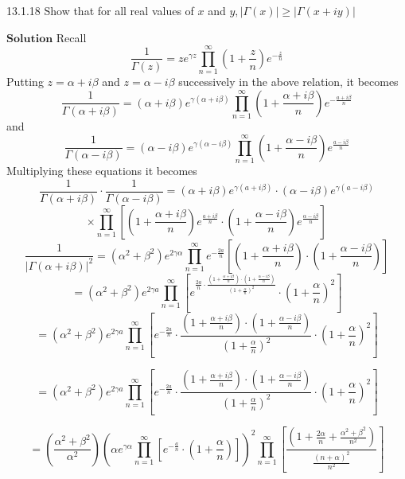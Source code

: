 \documentclass{styles/kaobook}
\begin{document}
\begin{greenbox}{13.1.18}
Show that for all real values of $x$ and $y,|\Gamma(x)| \geq|\Gamma(x+i y)|$
\end{greenbox}


$\boxed{\textbf{Solution}}$ Recall 
$$
\frac{1}{\Gamma(z)}=z e^{\gamma z} \prod_{n=1}^{\infty}\left(1+\frac{z}{n}\right) e^{-\frac{z}{n}}
$$
Putting $z=\alpha+i \beta$ and $z=\alpha-i \beta$ successively in the above relation, it becomes
$$
\frac{1}{\Gamma(\alpha+i \beta)}=(\alpha+i \beta) e^{\gamma(\alpha+i \beta)} \prod_{n=1}^{\infty}\left(1+\frac{\alpha+i \beta}{n}\right) e^{-\frac{a+i \beta}{n}}
$$
and 
$$
\frac{1}{\Gamma(\alpha-i \beta)}=(\alpha-i \beta) e^{\gamma(\alpha-i \beta)} \prod_{n=1}^{\infty}\left(1+\frac{\alpha-i \beta}{n}\right) e^{\frac{a-i \beta}{n}}
$$
Multiplying these equations it becomes
$$
\frac{1}{\Gamma(\alpha+i \beta)} \cdot \frac{1}{\Gamma(\alpha-i \beta)}=(\alpha+i \beta) e^{\gamma(a+i \beta)} \cdot(\alpha-i \beta) e^{\gamma(a-i \beta)}$$
$$\times \prod_{n=1}^{\infty}\left[\left(1+\frac{\alpha+i \beta}{n}\right) e^{\frac{a+i \beta}{n}} \cdot\left(1+\frac{\alpha-i \beta}{n}\right) e^{\frac{\alpha-i \beta}{n}}\right]
$$
$$
\frac{1}{|\Gamma(\alpha+i \beta)|^{2}}=\left(\alpha^{2}+\beta^{2}\right) e^{2\gamma \alpha} \prod_{n=1}^{\infty} e^{-\frac{2 a}{n}}\left[\left(1+\frac{\alpha+i \beta}{n}\right) \cdot\left(1+\frac{\alpha-i \beta}{n}\right)\right]
$$
$$
=\left(\alpha^{2}+\beta^{2}\right) e^{2 \gamma a} \prod_{n=1}^{\infty}\left[e^{\frac{2 a}{n} \cdot \frac{\left(1+\frac{\alpha+i \beta}{n}\right) \cdot\left(1+\frac{\alpha-i \beta}{n}\right)}{\left(1+\frac{\alpha}{n}\right)^{2}}} \cdot\left(1+\frac{\alpha}{n}\right)^{2}\right]
$$
$$
=\left(\alpha^{2}+\beta^{2}\right) e^{2 \gamma a} \prod_{n=1}^{\infty}\left[e^{-\frac{2 a}{n}} \cdot \frac{\left(1+\frac{\alpha+i \beta}{n}\right) \cdot\left(1+\frac{\alpha-i \beta}{n}\right)}{\left(1+\frac{\alpha}{n}\right)^{2}} \cdot\left(1+\frac{\alpha}{n}\right)^{2}\right]
$$

$$
=\left(\alpha^{2}+\beta^{2}\right) e^{2 \gamma a} \prod_{n=1}^{\infty}\left[e^{-\frac{2 a}{n}} \cdot \frac{\left(1+\frac{\alpha+i \beta}{n}\right) \cdot\left(1+\frac{\alpha-i \beta}{n}\right)}{\left(1+\frac{\alpha}{n}\right)^{2}} \cdot\left(1+\frac{\alpha}{n}\right)^{2}\right]
$$

$$
=\left(\frac{\alpha^{2}+\beta^{2}}{\alpha^{2}}\right)\left(\alpha e^{\gamma \alpha} \prod_{n=1}^{\infty}\left[e^{-\frac{a}{n}} \cdot\left(1+\frac{\alpha}{n}\right)\right]\right)^{2} \prod_{n=1}^{\infty}\left[\frac{\left(1+\frac{2 \alpha}{n}+\frac{\alpha^{2}+\beta^{2}}{n^{2}}\right)}{\frac{(n+\alpha)^{2}}{n^{2}}}\right]
$$
\end{document}
